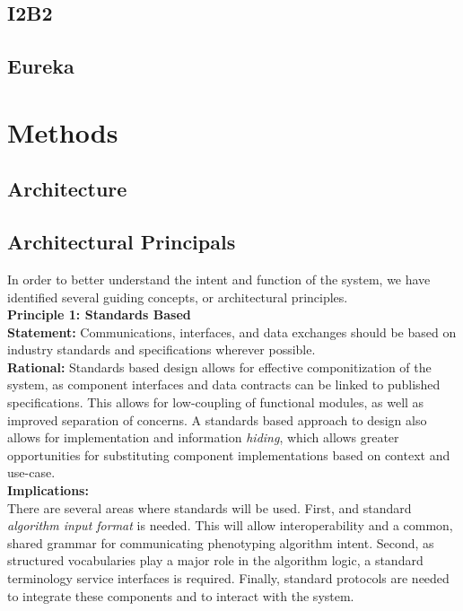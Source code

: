 \documentclass{amia}
\begin{document}
\subsection*{I2B2}

\subsection*{Eureka}

\section*{Methods}

\subsection*{Architecture}

\subsection*{Architectural Principals}
In order to better understand the intent and function of the system, we have identified several guiding concepts, or architectural principles\cite{garlan1993introduction}.\\

\textbf{Principle 1: Standards Based}\\
\textbf{Statement:} Communications, interfaces, and data exchanges should be based on industry standards and specifications wherever possible.\\
\textbf{Rational:} Standards based design allows for effective componitization of the system, as component interfaces and data contracts can be linked to published specifications. This allows for low-coupling of functional modules, as well as improved separation of concerns. A standards based approach to design also allows for implementation and information \textit{hiding}\cite{sullivan2001structure}, which allows greater opportunities for substituting component implementations based on context and use-case.\\
\textbf{Implications:}\\There are several areas where standards will be used. First, and standard \textit{algorithm input format} is needed. This will allow interoperability and a common, shared grammar for communicating phenotyping algorithm intent. Second, as structured vocabularies play a major role in the algorithm logic, a standard terminology service interfaces is required. Finally, standard protocols are needed to integrate these components and to interact with the system.
\end{document}
